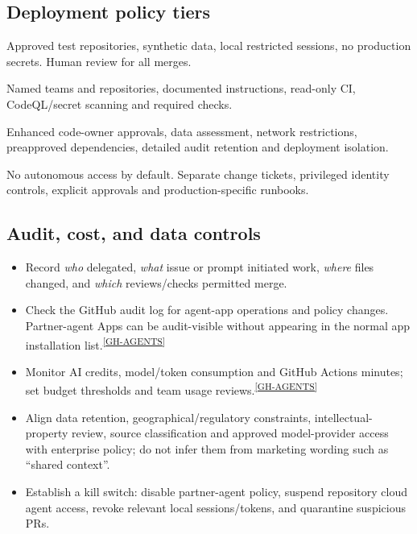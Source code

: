 \documentclass[11pt,letterpaper,oneside]{article}
\newcommand{\src}[1]{\textsuperscript{\hyperref[ref:#1]{[#1]}}}
\begin{document}
\subsection{Deployment policy tiers}
\begin{description}[style=nextline,leftmargin=1.5em,font=\bfseries]
\item[Tier 0 --- experimentation.] Approved test repositories, synthetic data, local restricted sessions, no production secrets. Human review for all merges.
\item[Tier 1 --- routine engineering.] Named teams and repositories, documented instructions, read-only CI, CodeQL/secret scanning and required checks.
\item[Tier 2 --- high-impact repositories.] Enhanced code-owner approvals, data assessment, network restrictions, preapproved dependencies, detailed audit retention and deployment isolation.
\item[Tier 3 --- privileged operations.] No autonomous access by default. Separate change tickets, privileged identity controls, explicit approvals and production-specific runbooks.
\end{description}

\subsection{Audit, cost, and data controls}
\begin{itemize}
\item Record \emph{who} delegated, \emph{what} issue or prompt initiated work, \emph{where} files changed, and \emph{which} reviews/checks permitted merge.
\item Check the GitHub audit log for agent-app operations and policy changes. Partner-agent Apps can be audit-visible without appearing in the normal app installation list.\src{GH-AGENTS}
\item Monitor AI credits, model/token consumption and GitHub Actions minutes; set budget thresholds and team usage reviews.\src{GH-AGENTS}
\item Align data retention, geographical/regulatory constraints, intellectual-property review, source classification and approved model-provider access with enterprise policy; do not infer them from marketing wording such as ``shared context''.
\item Establish a kill switch: disable partner-agent policy, suspend repository cloud agent access, revoke relevant local sessions/tokens, and quarantine suspicious PRs.
\end{itemize}
\end{document}
